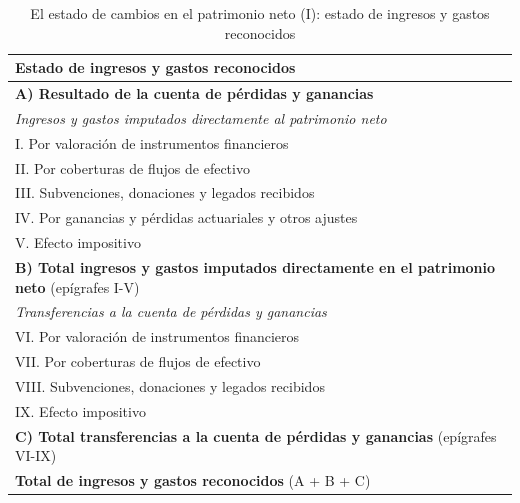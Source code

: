 \documentclass[11pt]{article}
\begin{document}
\begin{table}[H]
\centering
\caption{El estado de cambios en el patrimonio neto (I): estado de ingresos y gastos reconocidos}\label{tab:modelo-ecpn-a}
\footnotesize
\renewcommand{\arraystretch}{1.12}
\begin{tabular}{>{\raggedright\arraybackslash}m{13.6cm}}
\toprule
\rowcolor{tceeazulpalido}\textbf{Estado de ingresos y gastos reconocidos} \\
\midrule
\rowcolor{tceesalvia}\textbf{A) Resultado de la cuenta de pérdidas y ganancias} \\
\emph{Ingresos y gastos imputados directamente al patrimonio neto} \\
\hspace*{1em}I. Por valoración de instrumentos financieros \\
\hspace*{1em}II. Por coberturas de flujos de efectivo \\
\hspace*{1em}III. Subvenciones, donaciones y legados recibidos \\
\hspace*{1em}IV. Por ganancias y pérdidas actuariales y otros ajustes \\
\hspace*{1em}V. Efecto impositivo \\
\rowcolor{tceesalvia}\textbf{B) Total ingresos y gastos imputados directamente en el patrimonio neto} (epígrafes I-V) \\
\emph{Transferencias a la cuenta de pérdidas y ganancias} \\
\hspace*{1em}VI. Por valoración de instrumentos financieros \\
\hspace*{1em}VII. Por coberturas de flujos de efectivo \\
\hspace*{1em}VIII. Subvenciones, donaciones y legados recibidos \\
\hspace*{1em}IX. Efecto impositivo \\
\rowcolor{tceesalvia}\textbf{C) Total transferencias a la cuenta de pérdidas y ganancias} (epígrafes VI-IX) \\
\midrule
\rowcolor{tceesalvia}\textbf{Total de ingresos y gastos reconocidos} (A + B + C) \\
\bottomrule
\end{tabular}
\end{table}
\end{document}
